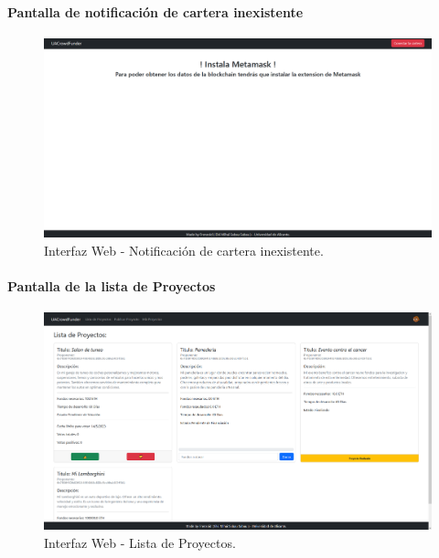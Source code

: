\paragraph{Pantalla de notificación de cartera inexistente}
\begin{figure}[H]
        \centering
        \includegraphics[width=1\textwidth]{img/interfaz/cartera_inexistente.png}
        \caption{Interfaz Web - Notificación de cartera inexistente.}
        \label{fig:configApi}
\end{figure}


\paragraph{Pantalla de la lista de Proyectos}
\begin{figure}[H]
        \centering
        \includegraphics[width=1\textwidth]{img/interfaz/lista_proyectos.png}
        \caption{Interfaz Web - Lista de Proyectos.}
        \label{fig:configApi}
\end{figure}

